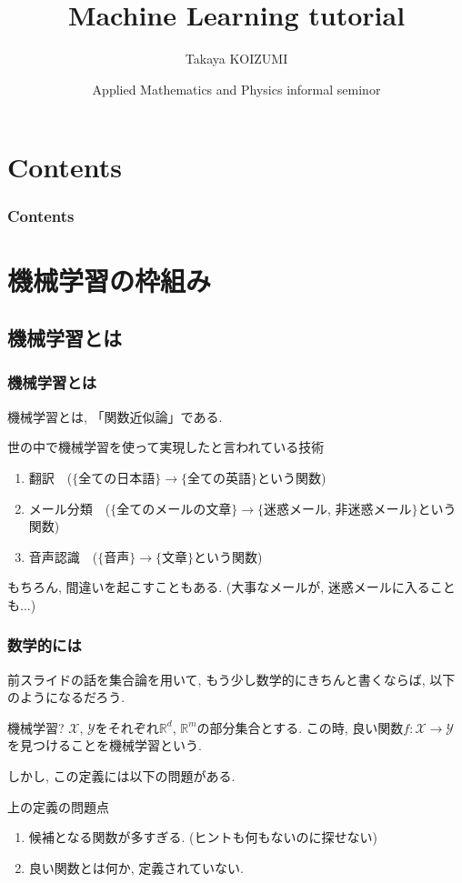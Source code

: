 \documentclass[dvipdfmx,11pt]{beamer}		%
\title{Machine Learning tutorial}
\author{Takaya KOIZUMI}
\institute{Mathematical Science, B4}
\date{Applied Mathematics and Physics informal seminor}
\newcommand{\R}{\mathbb{R}}
\newcommand{\X}{\mathcal{X}}
\newcommand{\Y}{\mathcal{Y}}
\begin{document}
    \begin{frame}\frametitle{}
        \titlepage
    \end{frame}
    \section*{Contents}
    \begin{frame}\frametitle{Contents}
        \begin{multicols}{2}
            \tableofcontents
        \end{multicols}
    \end{frame}
    \section{機械学習の枠組み}
    \subsection{機械学習とは}
    \begin{frame}\frametitle{機械学習とは}
        機械学習とは, 「関数近似論」である.
        \begin{block}{世の中で機械学習を使って実現したと言われている技術}
            \begin{enumerate}
                \item 翻訳~~($\{$全ての日本語$\}$$\to$$\{$全ての英語$\}$という関数)
                \item メール分類~~($\{$全てのメールの文章$\}$$\to$$\{$迷惑メール, 非迷惑メール$\}$という関数)
                \item 音声認識~~($\{$音声$\}$$\to$$\{$文章$\}$という関数)
            \end{enumerate}
        \end{block}
        もちろん, 間違いを起こすこともある. (大事なメールが, 迷惑メールに入ることも...)
    \end{frame}
    \begin{frame}\frametitle{数学的には}
        前スライドの話を集合論を用いて, もう少し数学的にきちんと書くならば, 以下のようになるだろう.
        \begin{block}{機械学習?}
            $\X$, $\Y$をそれぞれ$\R^d$, $\R^m$の部分集合とする. 
            この時, 良い関数$f:\X\to\Y$を見つけることを機械学習という. 
        \end{block} 
        しかし, この定義には以下の問題がある.
        \begin{block}{上の定義の問題点}
            \begin{enumerate}
                \item 候補となる関数が多すぎる. (ヒントも何もないのに探せない)
                \item 良い関数とは何か, 定義されていない.
            \end{enumerate}
        \end{block}
    \end{frame}
\end{document}
